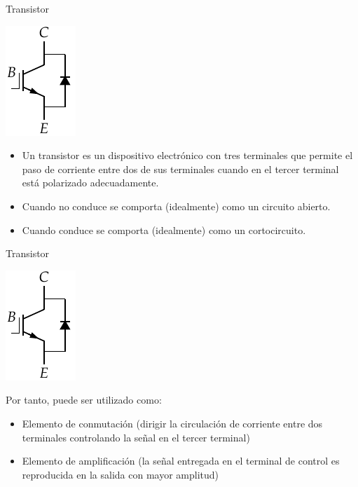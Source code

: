 \documentclass[xcolor={usenames,svgnames,dvipsnames}]{beamer}
\begin{document}
\begin{frame}[label={sec:org3e12b06}]{Transistor}
\begin{center}
\includegraphics[height=0.3\textheight]{../figs/Transistor.pdf}
\end{center}

\begin{itemize}
\item Un transistor es un dispositivo electrónico con tres terminales que
permite el paso de corriente entre dos de sus terminales cuando en el
tercer terminal está polarizado adecuadamente.

\item Cuando \alert{no conduce} se comporta (idealmente) como un \alert{circuito abierto}.

\item Cuando \alert{conduce} se comporta (idealmente) como un \alert{cortocircuito}.
\end{itemize}
\end{frame}


\begin{frame}[label={sec:org5c0b312}]{Transistor}
\begin{center}
\includegraphics[height=0.3\textheight]{../figs/Transistor.pdf}
\end{center}

Por tanto, puede ser utilizado como:

\begin{itemize}
\item \alert{Elemento de conmutación} (dirigir la circulación de corriente entre
dos terminales controlando la señal en el tercer terminal)

\item \alert{Elemento de amplificación} (la señal entregada en el terminal de
control es reproducida en la salida con mayor amplitud)
\end{itemize}
\end{frame}
\end{document}

